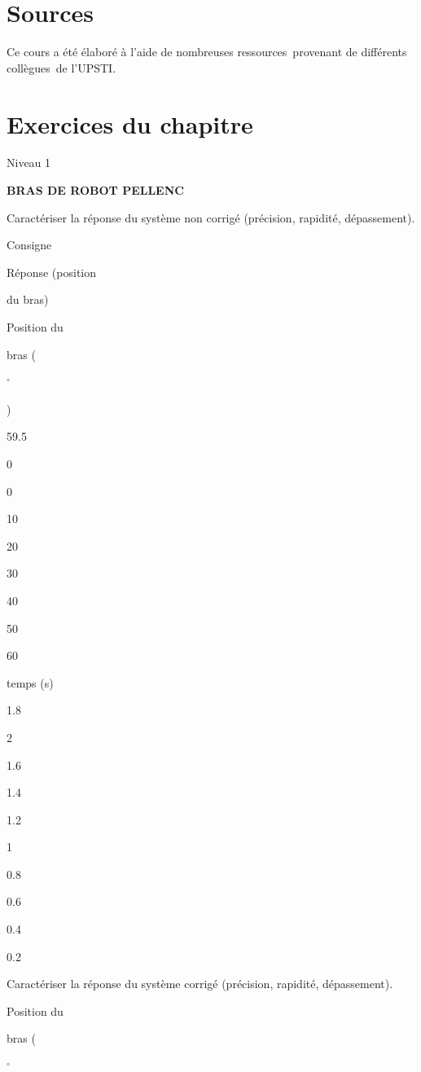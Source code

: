 \section{Sources}\label{sources}

Ce cours a été élaboré à l'aide de nombreuses ressources~provenant de
différents collègues~de l'UPSTI.

\section{Exercices du chapitre}\label{exercices-du-chapitre}



Niveau 1

\textbf{BRAS DE ROBOT PELLENC}

Caractériser la réponse du système non corrigé (précision, rapidité,
dépassement).

Consigne

Réponse (position

du bras)

Position du

bras (

$^\circ$

)

59.5

0

0

10

20

30

40

50

60

temps (s)

1.8

2

1.6

1.4

1.2

1

0.8

0.6

0.4

0.2

Caractériser la réponse du système corrigé (précision, rapidité,
dépassement).

Position du

bras (

$^\circ$

